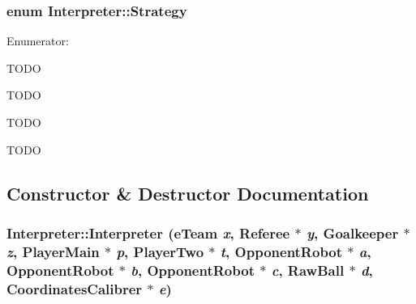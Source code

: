 \hypertarget{classInterpreter_a0fb49436c8c14ca79e13f1cd78119088}{
\subsubsection[{Strategy}]{\setlength{\rightskip}{0pt plus 5cm}enum {\bf Interpreter::Strategy}}}
\label{classInterpreter_a0fb49436c8c14ca79e13f1cd78119088}
\begin{Desc}
\item[Enumerator: ]\par
\begin{description}
\item[{\em 
\hypertarget{classInterpreter_a0fb49436c8c14ca79e13f1cd78119088af1c3928f408be0d85ce73e1686e519d9}{
INIT}
\label{classInterpreter_a0fb49436c8c14ca79e13f1cd78119088af1c3928f408be0d85ce73e1686e519d9}
}]TODO \item[{\em 
\hypertarget{classInterpreter_a0fb49436c8c14ca79e13f1cd78119088a8bf993c8b673e31f609171552d65c4c4}{
ATK}
\label{classInterpreter_a0fb49436c8c14ca79e13f1cd78119088a8bf993c8b673e31f609171552d65c4c4}
}]TODO \item[{\em 
\hypertarget{classInterpreter_a0fb49436c8c14ca79e13f1cd78119088ae58df17fd988314c295b980f6a5a6a75}{
DEF}
\label{classInterpreter_a0fb49436c8c14ca79e13f1cd78119088ae58df17fd988314c295b980f6a5a6a75}
}]TODO \item[{\em 
\hypertarget{classInterpreter_a0fb49436c8c14ca79e13f1cd78119088a5509091a7f3746995da83c92dd449187}{
MIX}
\label{classInterpreter_a0fb49436c8c14ca79e13f1cd78119088a5509091a7f3746995da83c92dd449187}
}]TODO \end{description}
\end{Desc}



\subsection{Constructor \& Destructor Documentation}
\hypertarget{classInterpreter_aa43e2d0df9f986ef4bde498aa8eadc04}{
\subsubsection[{Interpreter}]{\setlength{\rightskip}{0pt plus 5cm}Interpreter::Interpreter (eTeam {\em x}, \/  Referee $\ast$ {\em y}, \/  {\bf Goalkeeper} $\ast$ {\em z}, \/  {\bf PlayerMain} $\ast$ {\em p}, \/  {\bf PlayerTwo} $\ast$ {\em t}, \/  {\bf OpponentRobot} $\ast$ {\em a}, \/  {\bf OpponentRobot} $\ast$ {\em b}, \/  {\bf OpponentRobot} $\ast$ {\em c}, \/  RawBall $\ast$ {\em d}, \/  {\bf CoordinatesCalibrer} $\ast$ {\em e})}}
\label{classInterpreter_aa43e2d0df9f986ef4bde498aa8eadc04}

